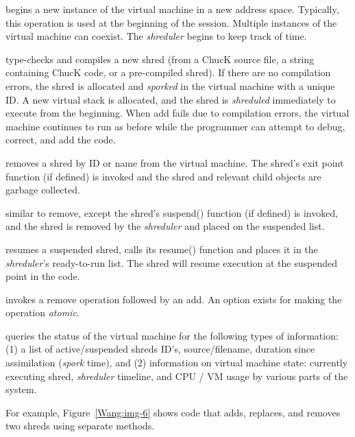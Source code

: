 \begin{description}[Type 1]
	\item[Execute]{begins a new instance of the virtual machine in a new
address space.  Typically, this operation is used at the beginning of the
session.  Multiple instances of the virtual machine can coexist.  The
\textit{shreduler} begins to keep track of time.}
	\item[Add]{type-checks and compiles a new shred (from a ChucK source file,
a string containing ChucK code, or a pre-compiled shred).  If there are no
compilation errors, the shred is allocated and \textit{sporked} in the virtual
machine with a unique ID.  A new virtual stack is allocated, and the shred is
\textit{shreduled} immediately to execute from the beginning.  When add fails due
to compilation errors, the virtual machine continues to run as before while the
programmer can attempt to debug, correct, and add the code.}
	\item[Remove]{removes a shred by ID or name from the virtual machine.  The
shred's exit point function (if defined) is invoked and the shred and relevant
child objects are garbage collected.}
	\item[Suspend]{similar to remove, except the shred's suspend() function (if
defined) is invoked, and the shred is removed by the \textit{shreduler} and
placed on the suspended list.}
	\item[Resume]{resumes a suspended shred, calls its resume() function and
places it in the \textit{shreduler}'s ready-to-run list.  The shred will resume
execution at the suspended point in the code.}
	\item[Replace]{invokes a remove operation followed by an add.  An option
exists for making the operation \textit{atomic}.}
	\item[Status]{queries the status of the virtual machine for the following
types of information: (1) a list of active/suspended shreds ID's,
source/filename, duration since assimilation (\textit{spork} time), and (2)
information on virtual machine state: currently executing shred,
\textit{shreduler} timeline, and CPU / VM usage by various parts of the system.}
\end{description}

For example, Figure~\ref{Wang:img-6} shows code that adds, replaces, and removes two shreds
using separate methods.

